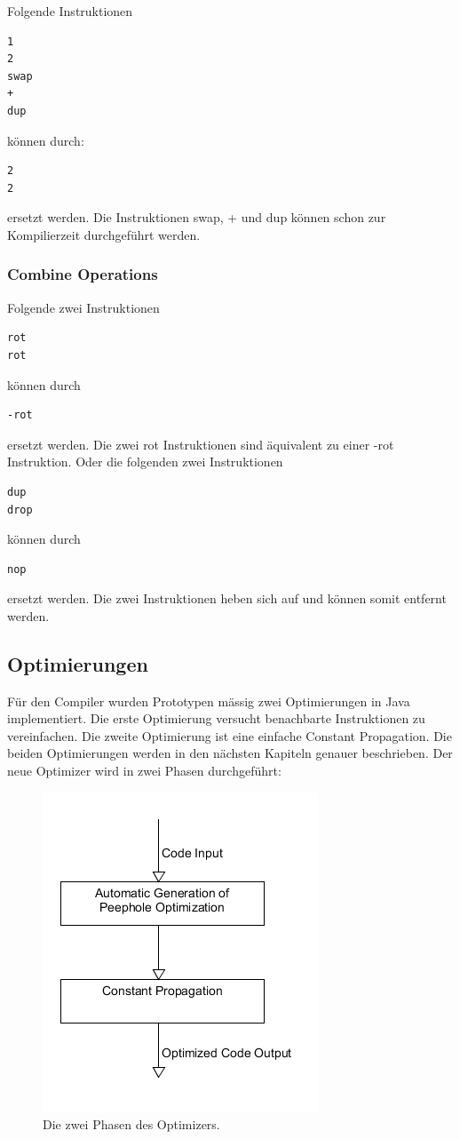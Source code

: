 Folgende Instruktionen
%
\begin{verbatim}
1
2
swap
+
dup
\end{verbatim}
%
können durch:
%
\begin{verbatim}
2
2
\end{verbatim}
%
ersetzt werden. Die Instruktionen swap, + und dup können schon zur Kompilierzeit durchgeführt werden.
\subsubsection{Combine Operations}
Folgende zwei Instruktionen
%
\begin{verbatim}
rot
rot
\end{verbatim}
%
können durch
%
\begin{verbatim}
-rot
\end{verbatim}
%
ersetzt werden. Die zwei rot Instruktionen sind äquivalent zu einer -rot Instruktion. Oder die folgenden zwei Instruktionen
%
\begin{verbatim}
dup
drop
\end{verbatim}
%
können durch
%
\begin{verbatim}
nop
\end{verbatim}
%
ersetzt werden. Die zwei Instruktionen heben sich auf und können somit entfernt werden.

\newpage

\subsection{Optimierungen}

Für den Compiler wurden Prototypen mässig zwei Optimierungen in Java implementiert. Die erste Optimierung versucht benachbarte Instruktionen zu vereinfachen. Die zweite Optimierung ist eine einfache Constant Propagation. Die beiden Optimierungen werden in den nächsten Kapiteln genauer beschrieben. Der neue Optimizer wird in zwei Phasen durchgeführt:

\begin{figure}[H]
	\centering
		\includegraphics[scale=0.6]{optimizer/optimizer.png}
		\caption{Die zwei Phasen des Optimizers.}
		\label{fig:extensionpoint}
\end{figure}

